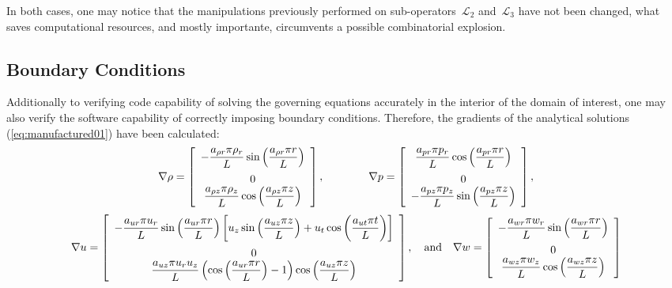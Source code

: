 \documentclass[10pt]{article}
\newcommand{\Lo}{\,\mathcal{L}}
\begin{document}
In both cases, one may notice that the manipulations previously performed on sub-operators $\Lo_2$ and $\Lo_3$ have not been changed, what saves computational resources, and mostly importante, circumvents a possible combinatorial explosion.




\subsection{Boundary Conditions}
Additionally to verifying code capability of solving the governing equations accurately in the interior of the domain of interest, one may also verify the software capability of correctly imposing boundary conditions. Therefore, the gradients of the  analytical solutions (\ref{eq:manufactured01}) have been calculated:
\begin{equation*}
\nabla  \rho= \left[ \begin{array}{c}
-\dfrac{  a_{\rho r}  \pi \rho_r}{L} \sin\left( \dfrac{ a_{\rho r}  \pi  r}{L}\right)\vspace{5pt} \\
 0\\
 \dfrac{  a_{\rho z}  \pi \rho_z}{L}  \cos\left( \dfrac{ a_{\rho z}  \pi  z}{L}\right)
\end{array} \right],
\qquad\quad\quad
\nabla p = \left[ \begin{array}{c}
  \dfrac{  a_{pr}  \pi p_r}{L} \cos\left( \dfrac{ a_{pr}  \pi  r}{L}\right)\vspace{5pt}\\
  0\\
- \dfrac{  a_{pz}  \pi p_z}{L} \sin\left( \dfrac{ a_{pz}  \pi  z}{L}\right)
\end{array} \right],
\end{equation*}
\begin{equation*}
\nabla u = \left[ \begin{array}{c}
  -\dfrac{  a_{ur}  \pi u_r }{L} \sin\left( \dfrac{ a_{ur}  \pi  r}{L}\right)\left[u_z\sin\left( \dfrac{ a_{uz}  \pi  z}{L}\right)+u_t\cos\left( \dfrac{ a_{ut}  \pi  t}{L}\right)\right]\vspace{5pt}\\
  0\\
   \dfrac{  a_{uz}  \pi u_r u_z}{L} \left( \cos\left( \dfrac{ a_{ur}  \pi  r}{L}\right) -1\right)\cos\left( \dfrac{ a_{uz}  \pi  z}{L}\right)
\end{array} \right],
\quad\mbox{and}\quad
\nabla w = \left[ \begin{array}{c}
-\dfrac{  a_{wr}  \pi  w_r}{L} \sin\left( \dfrac{ a_{wr}  \pi  r}{L}\right)\vspace{5pt}\\
 0\\
  \dfrac{  a_{wz}  \pi w_z}{L}  \cos\left( \dfrac{ a_{wz}  \pi  z}{L}\right)
\end{array} \right]
\end{equation*}
\end{document}
